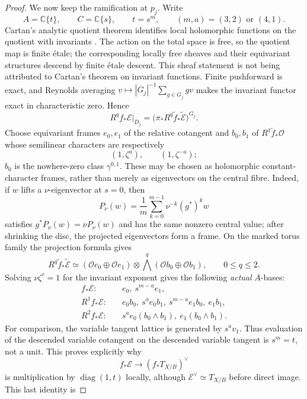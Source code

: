 \begin{proof}
We now keep the ramification at $p_j$.  Write
\[
 A=\mathbb C\{t\},\qquad C=\mathbb C\{s\},\qquad t=s^m,
 \qquad (m,a)=(3,2)\text{ or }(4,1).
\]
Cartan's analytic quotient theorem identifies local holomorphic functions on
the quotient with invariants \cite[\S1, Theorem~1, pp.~1--2]{Cartan1954Quotient}.
The action on the total space is free, so the quotient map is finite \'etale;
the corresponding locally free sheaves and their equivariant structures
descend by finite \'etale descent.  This sheaf statement is not being
attributed to Cartan's theorem on invariant functions.  Finite pushforward
is exact, and Reynolds averaging
$v\mapsto |G_j|^{-1}\sum_{g\in G_j}gv$ makes the invariant functor exact in
characteristic zero.  Hence
\[
 R^qf_*\mathcal E|_{D_j}
 =\bigl(\pi_*R^q\widetilde f_*\widetilde{\mathcal E}\bigr)^{G_j}.
\tag{WBH.11.3a}\label{inv:wb:eq:11.3a}
\]
Choose equivariant frames $e_0,e_1$ of the relative cotangent and
$b_0,b_1$ of $R^1\widetilde f_*\mathcal O$ whose semilinear characters are
respectively
\[
 (1,\zeta^a),\qquad (1,\zeta^{-a});
\]
$b_0$ is the nowhere-zero class $\gamma^{0,1}$.  These may be chosen as
holomorphic constant-character frames, rather than merely as eigenvectors on
the central fibre.  Indeed, if $w$ lifts a $\nu$-eigenvector at $s=0$, then
\[
 P_\nu(w)=\frac1m\sum_{k=0}^{m-1}\nu^{-k}(g^*)^kw
\]
satisfies $g^*P_\nu(w)=\nu P_\nu(w)$ and has the same nonzero central value;
after shrinking the disc, the projected eigenvectors form a frame.  On the
marked torus family the projection formula gives
\[
 R^q\widetilde f_*\widetilde{\mathcal E}
 \simeq
 (\mathcal O e_0\oplus\mathcal O e_1)
 \otimes
 \bigwedge^q(\mathcal O b_0\oplus\mathcal O b_1),
 \qquad 0\le q\le2.
\]
Solving
$\nu\zeta^r=1$ for the invariant exponent gives the following \emph{actual}
$A$-bases:
\begin{align*}
 f_*\mathcal E:\quad& e_0,\ s^{m-a}e_1,\\
 R^1f_*\mathcal E:\quad&
 e_0b_0,\ s^ae_0b_1,\ s^{m-a}e_1b_0,\ e_1b_1,\\
 R^2f_*\mathcal E:\quad&
 s^ae_0(b_0\wedge b_1),\ e_1(b_0\wedge b_1).
\tag{WBH.11.4}\label{inv:wb:eq:11.4}
\end{align*}
For comparison, the variable tangent lattice is generated by $s^av_1$.
Thus evaluation of the descended variable cotangent on the descended
variable tangent is $s^m=t$, not a unit.  This proves explicitly why
\[
 f_*\mathcal E\longrightarrow(f_*T_{X/B})^\vee
\]
is multiplication by $\operatorname{diag}(1,t)$ locally, although
$\mathcal E^\vee\simeq T_{X/B}$ before direct image.  This last identity is

\end{proof}
